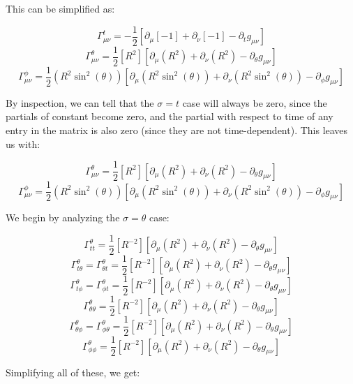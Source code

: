 \begin{enumerate}
\begin{enumerate}
          This can be simplified as:

          $$\Gamma^{t}_{\mu\nu}=-\frac{1}{2}\left[ \partial_{\mu}[-1]+\partial_{\nu}[-1]-\partial_{t}g_{\mu\nu}  \right]$$
          $$\Gamma^{\theta}_{\mu\nu}=\frac{1}{2}\left[ R^2 \right]\left[ \partial_{\mu}(R^2)+\partial_{\nu}(R^2)-\partial_{\theta}g_{\mu\nu}  \right]$$
          $$\Gamma^{\phi}_{\mu\nu}=\frac{1}{2}(R^2\sin^2(\theta))\left[ \partial_{\mu}(R^2\sin^2(\theta))+\partial_{\nu}(R^2\sin^2(\theta))-\partial_{\phi}g_{\mu\nu}  \right]$$

          By inspection, we can tell that the $\sigma=t$ case will always be zero, since the partials of constant become zero, and the partial with respect to time of any entry in the matrix is also zero (since they are not time-dependent). This leaves us with:

          $$\Gamma^{\theta}_{\mu\nu}=\frac{1}{2}\left[ R^2 \right]\left[ \partial_{\mu}(R^2)+\partial_{\nu}(R^2)-\partial_{\theta}g_{\mu\nu}  \right]$$
          $$\Gamma^{\phi}_{\mu\nu}=\frac{1}{2}(R^2\sin^2(\theta))\left[ \partial_{\mu}(R^2\sin^2(\theta))+\partial_{\nu}(R^2\sin^2(\theta))-\partial_{\phi}g_{\mu\nu}  \right]$$

          We begin by analyzing the $\sigma=\theta$ case:

          $$\Gamma^{\theta}_{tt}=\frac{1}{2}\left[ R^{-2} \right]\left[ \partial_{\mu}(R^2)+\partial_{\nu}(R^2)-\partial_{\theta}g_{\mu\nu}  \right]$$
          $$\Gamma^{\theta}_{t\theta}=\Gamma^{\theta}_{\theta t}=\frac{1}{2}\left[ R^{-2} \right]\left[ \partial_{\mu}(R^2)+\partial_{\nu}(R^2)-\partial_{\theta}g_{\mu\nu}  \right]$$
          $$\Gamma^{\theta}_{t\phi}=\Gamma^{\theta}_{\phi t}=\frac{1}{2}\left[ R^{-2} \right]\left[ \partial_{\mu}(R^2)+\partial_{\nu}(R^2)-\partial_{\theta}g_{\mu\nu}  \right]$$
          $$\Gamma^{\theta}_{\theta\theta}=\frac{1}{2}\left[ R^{-2} \right]\left[ \partial_{\mu}(R^2)+\partial_{\nu}(R^2)-\partial_{\theta}g_{\mu\nu}  \right]$$
          $$\Gamma^{\theta}_{\theta\phi}=\Gamma^{\theta}_{\phi\theta}=\frac{1}{2}\left[ R^{-2} \right]\left[ \partial_{\mu}(R^2)+\partial_{\nu}(R^2)-\partial_{\theta}g_{\mu\nu}  \right]$$
          $$\Gamma^{\theta}_{\phi\phi}=\frac{1}{2}\left[ R^{-2} \right]\left[ \partial_{\mu}(R^2)+\partial_{\nu}(R^2)-\partial_{\theta}g_{\mu\nu}  \right]$$

          Simplifying all of these, we get:


\end{enumerate}
\end{enumerate}
